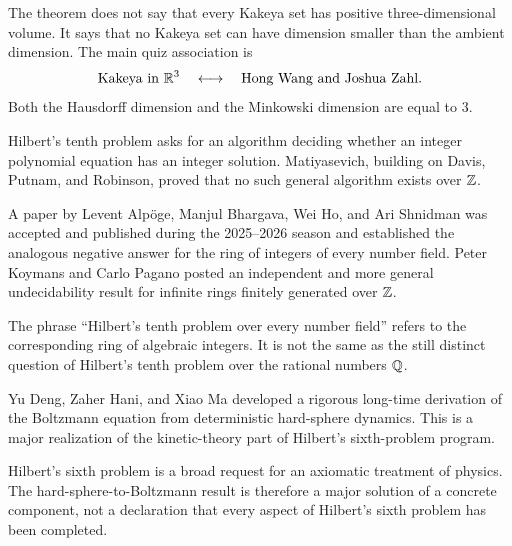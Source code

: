     \begin{idea}
        The theorem does not say that every Kakeya set has positive
        three-dimensional volume. It says that no Kakeya set can have dimension
        smaller than the ambient dimension. The main quiz association is
        \[
            \text{Kakeya in }\mathbb{R}^3
            \quad\longleftrightarrow\quad
            \text{Hong Wang and Joshua Zahl}.
        \]
        Both the Hausdorff dimension and the Minkowski dimension are equal to
        $3$.
    \end{idea}

    \begin{fact}
        Hilbert's tenth problem asks for an algorithm deciding whether an
        integer polynomial equation has an integer solution. Matiyasevich,
        building on Davis, Putnam, and Robinson, proved that no such general
        algorithm exists over $\mathbb{Z}$.

        A paper by Levent Alp\"oge, Manjul Bhargava, Wei Ho, and Ari
        Shnidman was accepted and published during the 2025--2026 season and
        established the analogous negative answer for the ring of integers of
        every number field. Peter Koymans and Carlo Pagano posted an independent
        and more general undecidability result for infinite rings finitely
        generated over $\mathbb{Z}$.
    \end{fact}

    \begin{remark}
        The phrase ``Hilbert's tenth problem over every number field'' refers to
        the corresponding ring of algebraic integers. It is not the same as the
        still distinct question of Hilbert's tenth problem over the rational
        numbers $\mathbb{Q}$.
    \end{remark}

    \begin{fact}
        Yu Deng, Zaher Hani, and Xiao Ma developed a rigorous long-time
        derivation of the Boltzmann equation from deterministic hard-sphere
        dynamics. This is a major realization of the kinetic-theory part of
        Hilbert's sixth-problem program.
    \end{fact}

    \begin{remark}
        Hilbert's sixth problem is a broad request for an axiomatic treatment of
        physics. The hard-sphere-to-Boltzmann result is therefore a major
        solution of a concrete component, not a declaration that every aspect of
        Hilbert's sixth problem has been completed.
    \end{remark}


